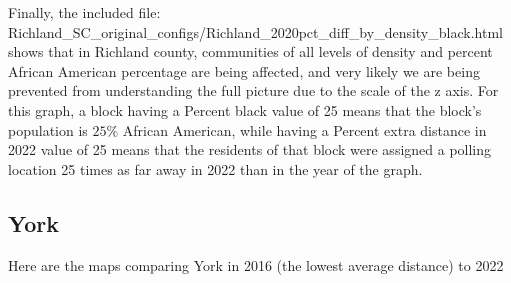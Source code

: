 \documentclass[11pt]{article}
\theoremstyle{remark}
\theoremstyle{definition}
\begin{document}
Finally, the included file: \textrm{Richland\_SC\_original\_configs/Richland\_2020pct\_diff\_by\_density\_black.html} shows that in Richland county, communities of all levels of density and percent African American percentage are being affected, and very likely we are being prevented from understanding the full picture due to the scale of the z axis. For this graph, a block having a Percent black value of 25 means that the block's population is $25\%$ African American, while having a Percent extra distance in 2022 value of 25 means that the residents of that block were assigned a polling location 25 times as far away in 2022 than in the year of the graph.

\subsection{York}
Here are the maps comparing York in 2016 (the lowest average distance) to 2022
\end{document}
